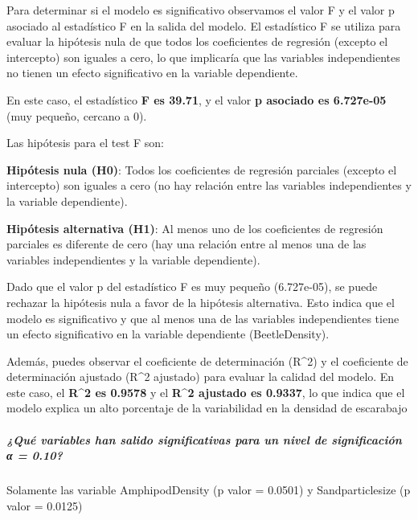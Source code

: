 \documentclass[
]{article}
\begin{document}
Para determinar si el modelo es significativo observamos el valor F y el
valor p asociado al estadístico F en la salida del modelo. El
estadístico F se utiliza para evaluar la hipótesis nula de que todos los
coeficientes de regresión (excepto el intercepto) son iguales a cero, lo
que implicaría que las variables independientes no tienen un efecto
significativo en la variable dependiente.

En este caso, el estadístico \textbf{F es 39.71}, y el valor \textbf{p
asociado es 6.727e-05} (muy pequeño, cercano a 0).

Las hipótesis para el test F son:

\textbf{Hipótesis nula (H0)}: Todos los coeficientes de regresión
parciales (excepto el intercepto) son iguales a cero (no hay relación
entre las variables independientes y la variable dependiente).

\textbf{Hipótesis alternativa (H1)}: Al menos uno de los coeficientes de
regresión parciales es diferente de cero (hay una relación entre al
menos una de las variables independientes y la variable dependiente).

Dado que el valor p del estadístico F es muy pequeño (6.727e-05), se
puede rechazar la hipótesis nula a favor de la hipótesis alternativa.
Esto indica que el modelo es significativo y que al menos una de las
variables independientes tiene un efecto significativo en la variable
dependiente (BeetleDensity).

Además, puedes observar el coeficiente de determinación (R\^{}2) y el
coeficiente de determinación ajustado (R\^{}2 ajustado) para evaluar la
calidad del modelo. En este caso, el \textbf{R\^{}2 es 0.9578} y el
\textbf{R\^{}2 ajustado es 0.9337}, lo que indica que el modelo explica
un alto porcentaje de la variabilidad en la densidad de escarabajo

\hypertarget{quuxe9-variables-han-salido-significativas-para-un-nivel-de-significaciuxf3n-ux3b1-0.10}{%
\subparagraph{\texorpdfstring{\textbf{¿Qué variables han salido
significativas para un nivel de significación α =
0.10?}}{¿Qué variables han salido significativas para un nivel de significación α = 0.10?}}\label{quuxe9-variables-han-salido-significativas-para-un-nivel-de-significaciuxf3n-ux3b1-0.10}}

Solamente las variable AmphipodDensity (p valor = 0.0501) y
Sandparticlesize (p valor = 0.0125)
\end{document}

